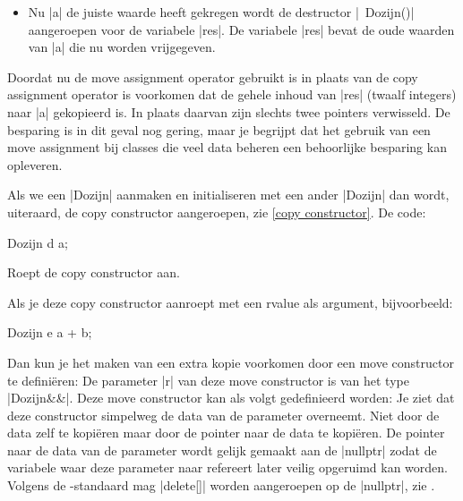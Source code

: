 \begin{cpplstShortInline}
\begin{itemize}
	\item 
	Nu |a| de juiste waarde heeft gekregen wordt de destructor |~Dozijn()| aangeroepen voor de variabele |res|.
	De variabele |res| bevat de oude waarden van |a| die nu worden vrijgegeven. 
\end{itemize}
Doordat nu de move assignment operator gebruikt is in plaats van de copy assignment operator is voorkomen dat de gehele inhoud van |res| (twaalf integers) naar |a| gekopieerd is. In plaats daarvan zijn slechts twee pointers verwisseld.
De besparing is in dit geval nog gering, maar je begrijpt dat het gebruik van een move assignment bij classes die veel data beheren een behoorlijke besparing kan opleveren. 

Als we een |Dozijn| aanmaken en initialiseren met een ander |Dozijn| dan wordt, uiteraard, de copy constructor aangeroepen, zie \cref{copy constructor}.
De code:   
\begin{cpplstfragment}
	Dozijn d {a};
\end{cpplstfragment}
Roept de copy constructor aan.

Als je deze copy constructor aanroept met een rvalue als argument, bijvoorbeeld:
\begin{cpplstfragment}
	Dozijn e {a + b};
\end{cpplstfragment}

Dan kun je het maken van een extra kopie voorkomen door een move constructor te definiëren:
De parameter |r| van deze move constructor is van het type |Dozijn&&|.
Deze move constructor kan als volgt gedefinieerd worden:
Je ziet dat deze constructor simpelweg de data van de parameter overneemt.
Niet door de data zelf te kopiëren maar door de pointer naar de data te kopiëren.
De pointer naar de data van de parameter wordt gelijk gemaakt aan de |nullptr| zodat de variabele waar deze parameter naar refereert later veilig opgeruimd kan worden.
Volgens de \Cpp{}-standaard mag |delete[]| worden aangeroepen op de |nullptr|, zie \cite[paragraaf 8.3.5]{ISO2023}.


\end{cpplstShortInline}
